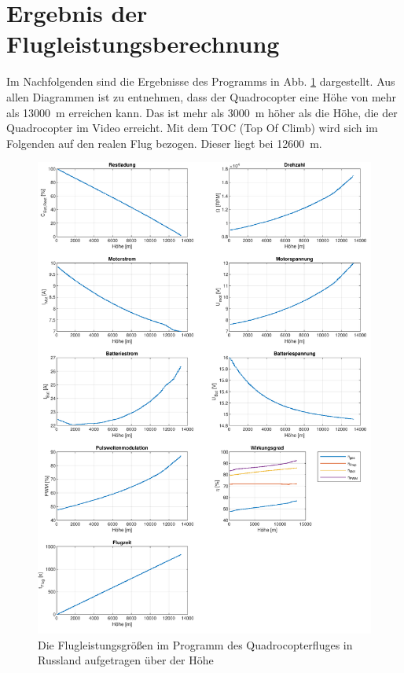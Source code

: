 \section{Ergebnis der Flugleistungsberechnung}
\label{sec:ergebnisse_quadrocopter}

Im Nachfolgenden sind die Ergebnisse des Programms in Abb. \ref{abb:ergebnisse_russland} dargestellt. Aus allen Diagrammen ist zu entnehmen, dass der Quadrocopter eine Höhe von mehr als \SI{13000}{m} erreichen kann. Das ist mehr als \SI{3000}{m} höher als die Höhe, die der Quadrocopter im Video erreicht. Mit dem TOC (Top Of Climb) wird sich im Folgenden auf den realen Flug bezogen. Dieser liegt bei \SI{12600}{m}.\\
\begin{figure}[H]
\centering
	\includegraphics[scale=0.7]{Diagramme/Russland.pdf}
	\caption{Die Flugleistungsgrößen im Programm des Quadrocopterfluges in Russland aufgetragen über der Höhe}
	\label{abb:ergebnisse_russland}
\end{figure}
